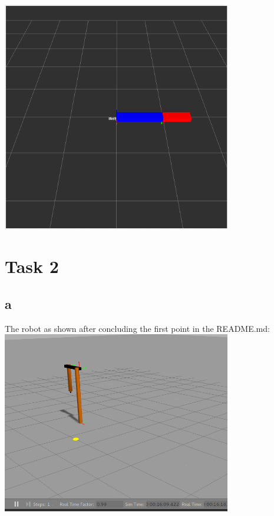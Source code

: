 \includegraphics[width=0.75\textwidth]{img/screen_ue4_t1_3.png}

\section{Task 2}\label{ass4_t2}

\subsection{a}\label{ass4_t2a}

The robot as shown after concluding the first point in the README.md:\\
\includegraphics[width=0.75\textwidth]{img/screen_ue4_t2_a1.png}\\


